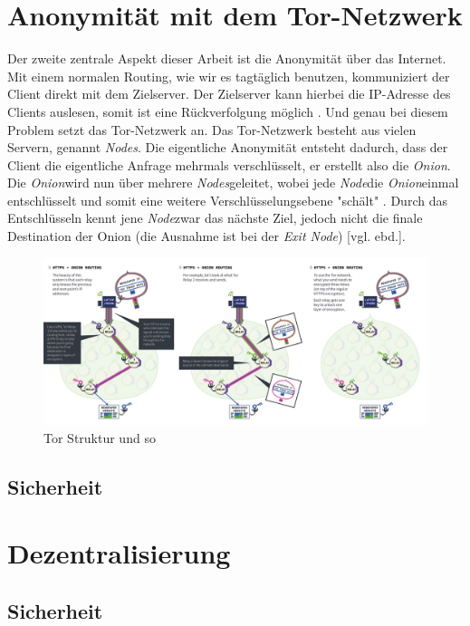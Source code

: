 \documentclass[a4paper,ngerman, headheight=28pt,12pt]{scrartcl}
\newcommand{\vcite}[1]{\cite[vgl.][]{#1}}
\newcommand{\vebd}{[vgl. ebd.]}
\newcommand{\exitn}{\textit{Exit Node}}
\newcommand{\nodes}{\textit{Nodes}}
\newcommand{\node}{\textit{Node}}
\newcommand{\onion}{\textit{Onion}}
\begin{document}
\section{Anonymität mit dem Tor-Netzwerk}
Der zweite zentrale Aspekt dieser Arbeit ist die Anonymität über das Internet. Mit einem normalen Routing, wie wir es tagtäglich benutzen, kommuniziert der Client direkt mit dem Zielserver. Der Zielserver kann hierbei die IP-Adresse des Clients auslesen, somit ist eine Rückverfolgung möglich \vcite{LocPolice,TCP_IP}. Und genau bei diesem Problem setzt das Tor-Netzwerk an. Das Tor-Netzwerk besteht aus vielen Servern, genannt \nodes \vcite{TorStructure}. Die eigentliche Anonymität entsteht dadurch, dass der Client die eigentliche Anfrage mehrmals verschlüsselt, er erstellt also die \onion. Die \onion wird nun über mehrere \nodes geleitet, wobei jede \node die \onion einmal entschlüsselt und somit eine weitere Verschlüsselungsebene "schält" \vcite{TorStructure2}. Durch das Entschlüsseln kennt jene \node zwar das nächste Ziel, jedoch nicht die finale Destination der Onion (die Ausnahme ist bei der \exitn) \vebd.

\begin{figure}[h]
  \centering
  \includegraphics[width=\textwidth]{tor structure.png}
  \caption{Tor Struktur und so \vcite{fig:Tor-Structure} \label{fig:TorStructure}}

\end{figure}
\subsection{Sicherheit}


\section{Dezentralisierung}
\subsection{Sicherheit}
\end{document}
